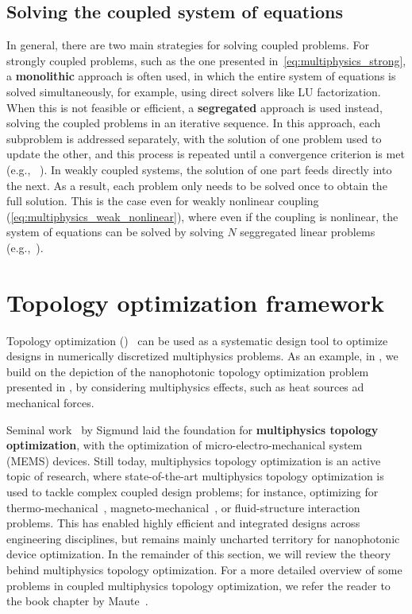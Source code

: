  \subsection*{Solving the coupled system of equations}

 In general, there are two main strategies for solving coupled problems. For strongly coupled problems, 
 such as the one presented in~\eqref{eq:multiphysics_strong}, a \textbf{monolithic} approach is often used, in which the entire system of 
 equations is solved simultaneously, for example, using direct solvers like LU factorization. When this is not feasible or 
 efficient, a \textbf{segregated} approach is used instead, solving the coupled problems in an iterative sequence. In this 
 approach, each subproblem is addressed separately, with the solution of one problem used to update the other, and this process 
 is repeated until a convergence criterion is met (e.g., ~\cite{ownpub5}). In weakly coupled systems, the solution of one part feeds directly into the next. 
 As a result, each problem only needs to be solved once to obtain the full solution. This is the case even for 
 weakly nonlinear coupling (\eqref{eq:multiphysics_weak_nonlinear}), where even if the coupling is nonlinear, the system of equations
 can be solved by solving $N$ seggregated linear problems (e.g.,~\cite{ownpub0}).
    
 \section{Topology optimization framework}\label{sec:topopt_theory}
 Topology optimization ()~\cite{topopt_book} can be used as a systematic design tool to optimize designs in numerically discretized multiphysics problems. 
 As an example, in , we build on the depiction of the nanophotonic topology optimization problem presented in , by considering
 multiphysics effects, such as heat sources ad mechanical forces.

 Seminal work~\cite{MEMS_multi} by Sigmund laid the foundation for \textbf{multiphysics topology optimization}, with the optimization of micro-electro-mechanical system (MEMS) devices. 
 Still today, multiphysics topology optimization is an active topic of research, where state-of-the-art multiphysics topology optimization is used to tackle complex coupled design problems; for instance, optimizing for thermo-mechanical~\cite{third_thermal}, magneto-mechanical~\cite{magneto}, or fluid-structure interaction~\cite{fsint} problems. 
 This has enabled highly efficient and integrated designs across engineering disciplines, but remains mainly uncharted territory for nanophotonic device optimization. In the remainder of this section, we will review the theory behind multiphysics topology optimization. For a more detailed overview of some problems in coupled multiphysics
 topology optimization, we refer the reader to the book chapter by Maute~\cite{coupled_topopt}.
    
